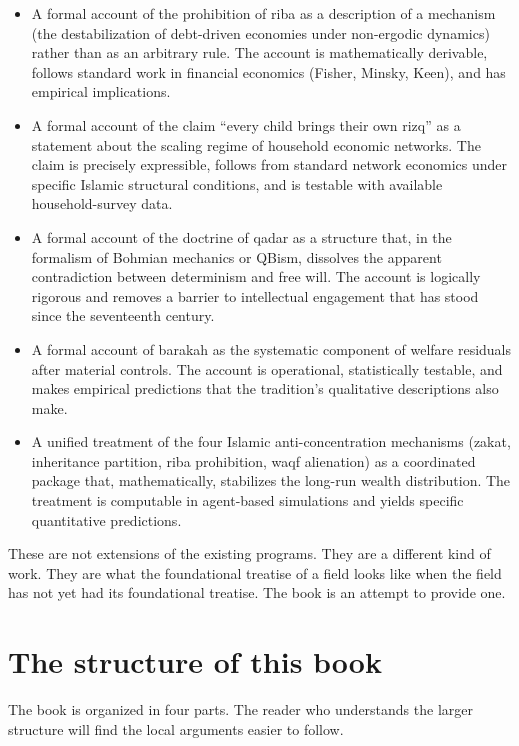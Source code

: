 \begin{itemize}[leftmargin=2em]
    \item A formal account of the prohibition of riba as a
    description of a mechanism (the destabilization of debt-driven
    economies under non-ergodic dynamics) rather than as an
    arbitrary rule. The account is mathematically derivable, follows
    standard work in financial economics (Fisher, Minsky, Keen),
    and has empirical implications.
    \item A formal account of the claim ``every child brings their
    own rizq'' as a statement about the scaling regime of household
    economic networks. The claim is precisely expressible, follows
    from standard network economics under specific Islamic
    structural conditions, and is testable with available
    household-survey data.
    \item A formal account of the doctrine of qadar as a structure
    that, in the formalism of Bohmian mechanics or QBism, dissolves
    the apparent contradiction between determinism and free will.
    The account is logically rigorous and removes a barrier to
    intellectual engagement that has stood since the seventeenth
    century.
    \item A formal account of barakah as the systematic component of
    welfare residuals after material controls. The account is
    operational, statistically testable, and makes empirical
    predictions that the tradition's qualitative descriptions also
    make.
    \item A unified treatment of the four Islamic
    anti-concentration mechanisms (zakat, inheritance partition,
    riba prohibition, waqf alienation) as a coordinated package
    that, mathematically, stabilizes the long-run wealth
    distribution. The treatment is computable in agent-based
    simulations and yields specific quantitative predictions.
\end{itemize}

These are not extensions of the existing programs. They are a
different kind of work. They are what the foundational treatise of a
field looks like when the field has not yet had its foundational
treatise. The book is an attempt to provide one.

\section{The structure of this book}
\label{sec:structure}

The book is organized in four parts. The reader who understands the
larger structure will find the local arguments easier to follow.


